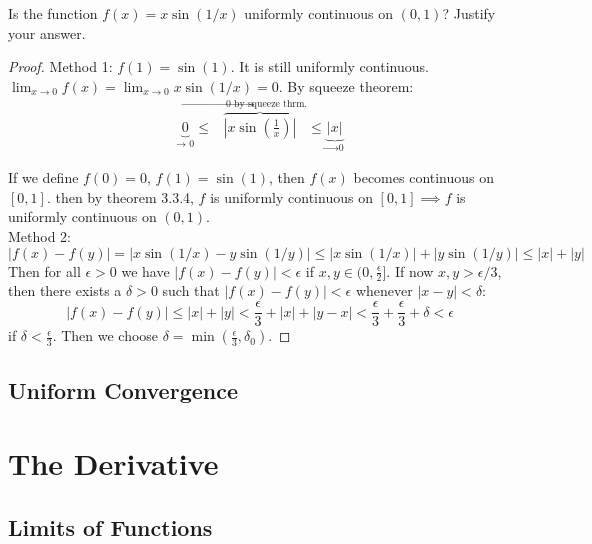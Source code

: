 \documentclass[12pt]{book}
\newenvironment{exercise}[2][Exercise]{\begin{trivlist}
\item[\hskip \labelsep {\bfseries #1}\hskip \labelsep {\bfseries #2.}]}{\end{trivlist}}
\begin{document}
\begin{exercise}{3.3.10}
    Is the function $f(x)=x \sin(1/x)$ uniformly continuous on $(0,1)$? Justify your answer. \\

    \begin{proof}
    Method 1: $f(1)=\sin(1)$. It is still uniformly continuous. $\lim_{x \to 0} f(x)= \lim_{x \to 0} x \sin(1/x) = 0$. By squeeze theorem:
		\begin{align*}
		\underbrace{0}_\text{$\to$ 0} \leq \overbrace{|x \sin \left( \frac{1}{x} \right) |}^\text{$\to$ 0 by squeeze thrm.} \leq \underbrace{|x|}_\text{$\to$ 0}
		\end{align*}

    If we define $f(0)=0$, $f(1)=\sin(1)$, then $f(x)$ becomes continuous on $[0,1]$. then by theorem 3.3.4, $f$ is uniformly continuous on $[0,1] \implies f$ is uniformly continuous on $(0,1)$.\\
    Method 2:
        \[ |f(x)-f(y)| = |x \sin(1/x) - y \sin(1/y)| \leq |x \sin(1/x)| + |y \sin(1/y)| \leq |x|+|y| \]
    Then for all $\epsilon>0$ we have $|f(x)-f(y)|<\epsilon$ if $x,y \in (0,\frac{\epsilon}{2}]$. If now $x,y > \epsilon/3$, then there exists a $\delta>0$ such that $|f(x)-f(y)| <\epsilon$ whenever $|x-y| < \delta$:
        \[ |f(x)-f(y)| \leq |x|+|y| < \frac{\epsilon}{3} + |x| + |y-x| < \frac{\epsilon}{3} + \frac{\epsilon}{3}+ \delta < \epsilon \]
    if $\delta< \frac{\epsilon}{3}$. Then we choose $\delta= \min(\frac{\epsilon}{3}, \delta_0)$.
    \end{proof}
\end{exercise}


\section{Uniform Convergence}



\chapter{The Derivative}
\section{Limits of Functions}



\end{document}

